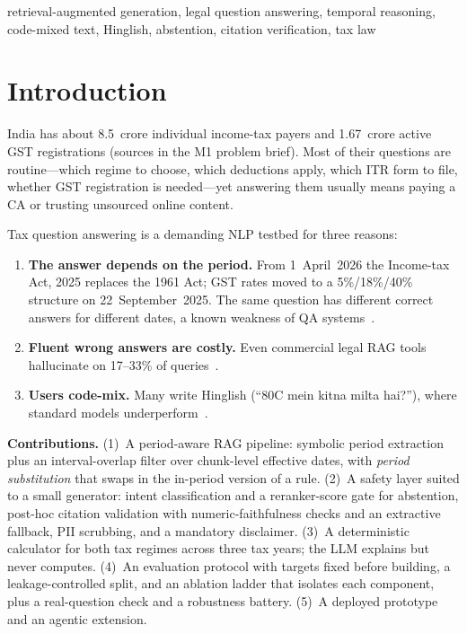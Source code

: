 \documentclass[conference]{IEEEtran}
\begin{document}
\begin{IEEEkeywords}
retrieval-augmented generation, legal question answering, temporal reasoning, code-mixed text, Hinglish,
abstention, citation verification, tax law
\end{IEEEkeywords}

\section{Introduction}

India has about 8.5~crore individual income-tax payers and 1.67~crore active GST registrations
(sources in the M1 problem brief). Most of their questions are routine---which regime to choose, which
deductions apply, which ITR form to file, whether GST registration is needed---yet answering them usually
means paying a CA or trusting unsourced online content.

Tax question answering is a demanding NLP testbed for three reasons:
\begin{enumerate}
\item \textbf{The answer depends on the period.} From 1~April~2026 the Income-tax Act, 2025 replaces the 1961
Act; GST rates moved to a 5\%/18\%/40\% structure on 22~September~2025. The same question has different correct
answers for different dates, a known weakness of QA systems~\cite{zhang2021situatedqa,chen2021timeqa}.
\item \textbf{Fluent wrong answers are costly.} Even commercial legal RAG tools hallucinate on 17--33\% of
queries~\cite{magesh2025hallucination}.
\item \textbf{Users code-mix.} Many write Hinglish (``80C mein kitna milta hai?''), where standard models
underperform~\cite{khanuja2020gluecos}.
\end{enumerate}

\textbf{Contributions.} (1)~A period-aware RAG pipeline: symbolic period extraction plus an
interval-overlap filter over chunk-level effective dates, with \emph{period substitution} that swaps in the
in-period version of a rule. (2)~A safety layer suited to a small generator: intent classification and a
reranker-score gate for abstention, post-hoc citation validation with numeric-faithfulness checks and an
extractive fallback, PII scrubbing, and a mandatory disclaimer. (3)~A deterministic calculator for both tax
regimes across three tax years; the LLM explains but never computes. (4)~An evaluation protocol with targets
fixed before building, a leakage-controlled split, and an ablation ladder that isolates each component,
plus a real-question check and a robustness battery. (5)~A deployed prototype and an agentic extension.
\end{document}
